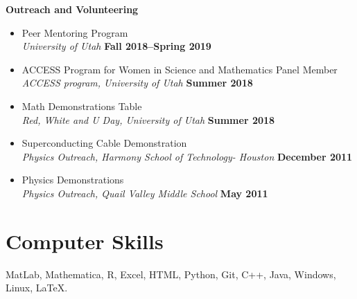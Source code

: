 \documentclass[margin,line]{res}
\begin{document}
\begin{resume}
{\bf Outreach and Volunteering}
\begin{itemize}
    \item[ ] Peer Mentoring Program
    \\ {\it University of Utah} \hfill {\bf Fall 2018--Spring 2019}
    \item[ ] ACCESS Program for Women in Science and Mathematics Panel Member 
    \\ {\it ACCESS program, University of Utah} \hfill {\bf Summer 2018}
    \item[ ] Math Demonstrations Table
    \\ {\it Red, White and U Day, University of Utah} \hfill {\bf Summer 2018}
    \item[ ] Superconducting Cable Demonstration
    \\ {\it Physics Outreach, Harmony School of Technology- Houston} \hfill {\bf December 2011}
    \item[ ] Physics Demonstrations
    \\ {\it Physics Outreach, Quail Valley Middle School} \hfill {\bf May 2011}
\end{itemize}



\section{\sc Computer Skills} 
MatLab, Mathematica, R, Excel, HTML, Python, Git, C++, Java, Windows, Linux, \LaTeX.


\end{resume}
\end{document}
